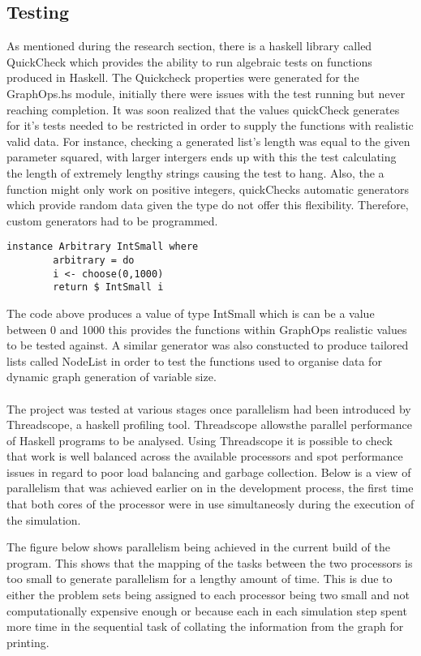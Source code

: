 \documentclass[main.tex]{subfiles}
\begin{document}
\subsection{Testing}
As mentioned during the research section, there is a haskell library called QuickCheck which provides the ability to run algebraic tests on functions produced in Haskell. The Quickcheck properties were generated for the GraphOps.hs module, initially there were issues with the test running but never reaching completion. It was soon realized that the values quickCheck generates for it's tests needed to be restricted in order to supply the functions with realistic valid data. For instance, checking a generated list's length was equal to the given parameter squared, with larger intergers ends up with this the test calculating the length of extremely lengthy strings causing the test to hang. Also, the a function might only work on positive integers, quickChecks automatic generators which provide random data given the type do not offer this flexibility. Therefore, custom generators had to be programmed.

\begin{lstlisting}
instance Arbitrary IntSmall where
        arbitrary = do
        i <- choose(0,1000)
        return $ IntSmall i
\end{lstlisting}

The code above produces a value of type IntSmall which is can be a value between 0 and 1000 this provides the functions within GraphOps realistic values to be tested against. A similar generator was also constucted to produce tailored lists called NodeList in order to test the functions used to organise data for dynamic graph generation of variable size. 

\paragraph{}The project was tested at various stages once parallelism had been introduced by Threadscope, a haskell profiling tool. Threadscope allowsthe parallel performance of Haskell programs to be analysed. Using Threadscope it is possible to check that work is well balanced across the available processors and spot performance issues in regard to poor load balancing and garbage collection. Below is a view of parallelism that was achieved earlier on in the development process, the first time that both cores of the processor were in use simultaneosly during the execution of the simulation. 


The figure below shows parallelism being achieved in the current build of the program. This shows that the mapping of the tasks between the two processors is too small to generate parallelism for a lengthy amount of time. This is due to either the problem sets being assigned to each processor being two small and not computationally expensive enough or because each in each simulation step spent more time in the sequential task of collating the information from the graph for printing.

\end{document}
